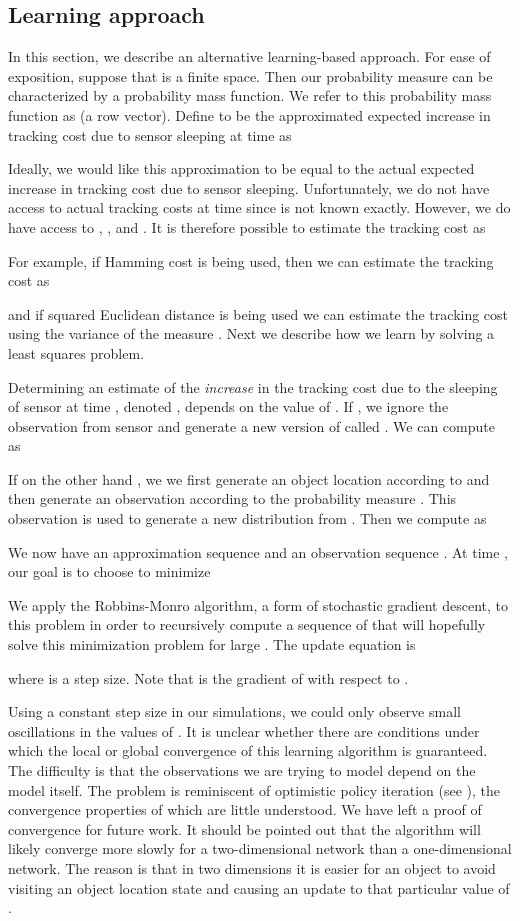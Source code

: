 \documentclass[journal,draftcls,onecolumn,11pt]{IEEEtran}
\begin{document}
\subsection{Learning approach}  \label{sec:learning}
In this section, we describe an alternative learning-based approach. For ease of exposition, suppose that  is a finite space.  Then our probability measure  can be characterized by a probability mass function.  We refer to this probability mass function as  (a row vector).  Define  to be the approximated expected increase in tracking cost due to sensor  sleeping at time  as

Ideally, we would like this approximation to be equal to the actual expected increase in tracking cost due to sensor  sleeping.  Unfortunately, we do not have access to actual tracking costs at time  since  is not known exactly.  However, we do have access to , , and .  It is therefore possible to estimate the tracking cost as

For example, if Hamming cost is being used, then we can estimate the tracking cost as

and if squared Euclidean distance is being used we can estimate the tracking cost using the variance of the measure . Next we describe how we learn  by solving a least squares problem.

Determining an estimate of the {\em increase} in the tracking cost due to the sleeping of sensor  at time , denoted , depends on the value of .  If , we ignore the observation from sensor  and generate a new version of  called .  We can compute  as

If on the other hand , we we first generate an object location  according to  and then generate an observation according to the probability measure .  This observation is used to generate a new distribution  from .  Then we compute  as


We now have an approximation sequence  and an observation sequence . At time , our goal is to choose  to minimize

We apply the Robbins-Monro algorithm, a form of stochastic gradient descent, to this problem in order to recursively compute a sequence of  that will hopefully solve this minimization problem for large .  The update equation is

where  is a step size.  Note that  is the gradient of  with respect to .

Using a constant step size in our simulations, we could only observe small oscillations in the values of . It is unclear whether there are conditions under which the local or global convergence of this learning algorithm is guaranteed.  The difficulty is that the observations we are trying to model depend on the model itself.  The problem is reminiscent of optimistic policy iteration (see \cite{bertsekas07}), the convergence properties of which are little understood.  We have left a proof of convergence for future work.  It should be pointed out that the algorithm will likely converge more slowly for a two-dimensional network than a one-dimensional network.  The reason is that in two dimensions it is easier for an object to avoid visiting an object location state and causing an update to that particular value of .
\end{document}
